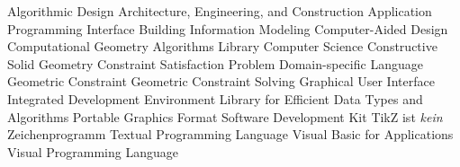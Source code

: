 \begin{acronym}[B-Rep]
     {Algorithmic Design}
    {Architecture, Engineering, and Construction}
    {Application Programming Interface}
    {Building Information Modeling}
    {Computer-Aided Design}
   {Computational Geometry Algorithms Library}
     {Computer Science}
    {Constructive Solid Geometry}
    {Constraint Satisfaction Problem}
    {Domain-specific Language}
     {Geometric Constraint}
    {Geometric Constraint Solving}
    {Graphical User Interface}
    {Integrated Development Environment}
   {Library for Efficient Data Types and Algorithms}
    {Portable Graphics Format}
    {Software Development Kit}
   {TikZ ist \textit{kein} Zeichenprogramm}
    {Textual Programming Language}
    {Visual Basic for Applications}
    {Visual Programming Language}
\end{acronym}
